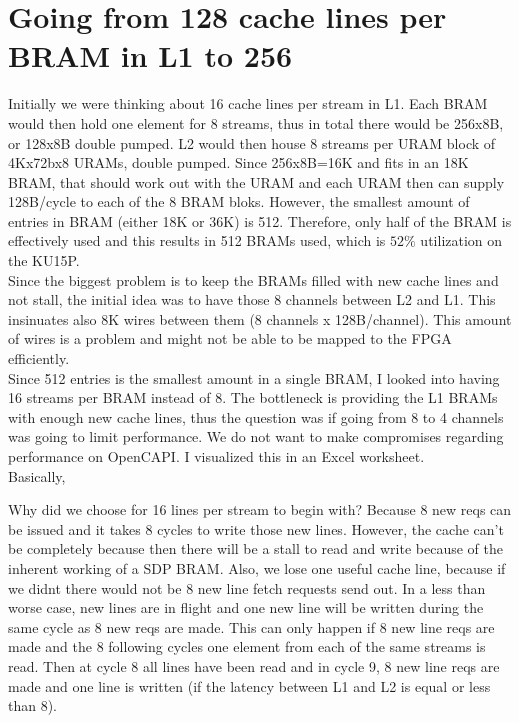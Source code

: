 \section{Going from 128 cache lines per BRAM in L1 to 256}
Initially we were thinking about 16 cache lines per stream in L1. Each BRAM would then hold one element for 8 streams, thus in total there would be 256x8B, or 128x8B double pumped. L2 would then house 8 streams per URAM block of 4Kx72bx8 URAMs, double pumped. Since 256x8B=16K and fits in an 18K BRAM, that should work out with the URAM and each URAM then can supply 128B/cycle to each of the 8 BRAM bloks. However, the smallest amount of entries in BRAM (either 18K or 36K) is 512. Therefore, only half of the BRAM is effectively used and this results in 512 BRAMs used, which is $52\%$ utilization on the KU15P.\\
Since the biggest problem is to keep the BRAMs filled with new cache lines and not stall, the initial idea was to have those 8 channels between L2 and L1. This insinuates also 8K wires between them (8 channels x 128B/channel). This amount of wires is a problem and might not be able to be mapped to the FPGA efficiently.\\
Since 512 entries is the smallest amount in a single BRAM, I looked into having 16 streams per BRAM instead of 8. The bottleneck is providing the L1 BRAMs with enough new cache lines, thus the question was if going from 8 to 4 channels was going to limit performance. We do not want to make compromises regarding performance on OpenCAPI. I visualized this in an Excel worksheet.\\
Basically,


Why did we choose for 16 lines per stream to begin with? Because 8 new reqs can be issued and it takes 8 cycles to write those new lines. However, the cache can't be completely because then there will be a stall to read and write because of the inherent working of a SDP BRAM. Also, we lose one useful cache line, because if we didnt there would not be 8 new line fetch requests send out. In a less than worse case, new lines are in flight and one new line will be written during the same cycle as 8 new reqs are made. This can only happen if 8 new line reqs are made and the 8 following cycles one element from each of the same streams is read. Then at cycle 8 all lines have been read and in cycle 9, 8 new line reqs are made and one line is written (if the latency between L1 and L2 is equal or less than 8).

